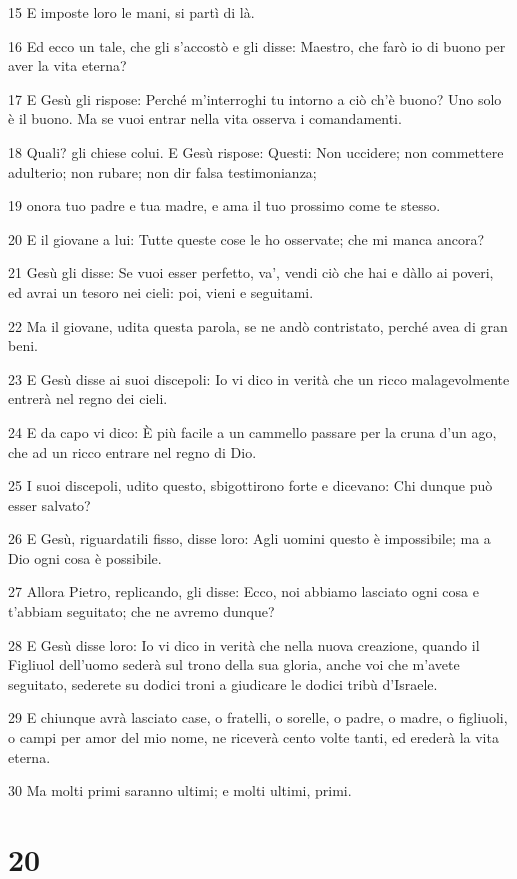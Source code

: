\par 15 E imposte loro le mani, si partì di là.
\par 16 Ed ecco un tale, che gli s'accostò e gli disse: Maestro, che farò io di buono per aver la vita eterna?
\par 17 E Gesù gli rispose: Perché m'interroghi tu intorno a ciò ch'è buono? Uno solo è il buono. Ma se vuoi entrar nella vita osserva i comandamenti.
\par 18 Quali? gli chiese colui. E Gesù rispose: Questi: Non uccidere; non commettere adulterio; non rubare; non dir falsa testimonianza;
\par 19 onora tuo padre e tua madre, e ama il tuo prossimo come te stesso.
\par 20 E il giovane a lui: Tutte queste cose le ho osservate; che mi manca ancora?
\par 21 Gesù gli disse: Se vuoi esser perfetto, va', vendi ciò che hai e dàllo ai poveri, ed avrai un tesoro nei cieli: poi, vieni e seguitami.
\par 22 Ma il giovane, udita questa parola, se ne andò contristato, perché avea di gran beni.
\par 23 E Gesù disse ai suoi discepoli: Io vi dico in verità che un ricco malagevolmente entrerà nel regno dei cieli.
\par 24 E da capo vi dico: È più facile a un cammello passare per la cruna d'un ago, che ad un ricco entrare nel regno di Dio.
\par 25 I suoi discepoli, udito questo, sbigottirono forte e dicevano: Chi dunque può esser salvato?
\par 26 E Gesù, riguardatili fisso, disse loro: Agli uomini questo è impossibile; ma a Dio ogni cosa è possibile.
\par 27 Allora Pietro, replicando, gli disse: Ecco, noi abbiamo lasciato ogni cosa e t'abbiam seguitato; che ne avremo dunque?
\par 28 E Gesù disse loro: Io vi dico in verità che nella nuova creazione, quando il Figliuol dell'uomo sederà sul trono della sua gloria, anche voi che m'avete seguitato, sederete su dodici troni a giudicare le dodici tribù d'Israele.
\par 29 E chiunque avrà lasciato case, o fratelli, o sorelle, o padre, o madre, o figliuoli, o campi per amor del mio nome, ne riceverà cento volte tanti, ed erederà la vita eterna.
\par 30 Ma molti primi saranno ultimi; e molti ultimi, primi.

\chapter{20}

